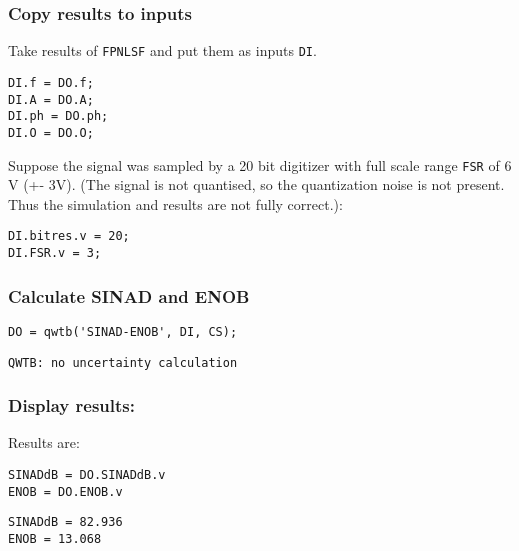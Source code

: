 {}
\subsubsection*{Copy results to inputs}



Take results of \texttt{FPNLSF} and put them as inputs \texttt{DI}.

\begin{lstlisting}
DI.f = DO.f;
DI.A = DO.A;
DI.ph = DO.ph;
DI.O = DO.O;
\end{lstlisting}


Suppose the signal was sampled by a 20 bit digitizer with full scale range \texttt{FSR} of 6 V (+- 3V). (The
signal is not quantised, so the quantization noise is not present. Thus the simulation and results
are not fully correct.):

\begin{lstlisting}
DI.bitres.v = 20;
DI.FSR.v = 3;
\end{lstlisting}


{}
\subsubsection*{Calculate SINAD and ENOB}

\begin{lstlisting}
DO = qwtb('SINAD-ENOB', DI, CS);
\end{lstlisting}
\begin{lstlisting}[language={},xleftmargin=5pt,frame=none]
QWTB: no uncertainty calculation

\end{lstlisting}


{}
\subsubsection*{Display results:}



Results are:

\begin{lstlisting}
SINADdB = DO.SINADdB.v
ENOB = DO.ENOB.v
\end{lstlisting}
\begin{lstlisting}[language={},xleftmargin=5pt,frame=none]
SINADdB = 82.936
ENOB = 13.068

\end{lstlisting}


